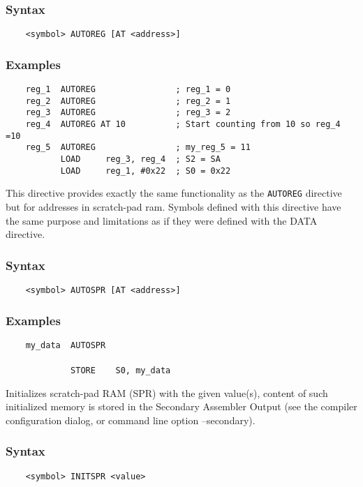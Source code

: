     \subsubsection{Syntax}
        \verb'    <symbol> AUTOREG [AT <address>]'

    \subsubsection{Examples}
        \verb'    reg_1  AUTOREG                ; reg_1 = 0'\\
        \verb'    reg_2  AUTOREG                ; reg_2 = 1'\\
        \verb'    reg_3  AUTOREG                ; reg_3 = 2'\\
        \verb'    reg_4  AUTOREG AT 10          ; Start counting from 10 so reg_4 =10'\\
        \verb'    reg_5  AUTOREG                ; my_reg_5 = 11'
        \verb''\\
        \verb'           LOAD     reg_3, reg_4  ; S2 = SA'\\
        \verb'           LOAD     reg_1, #0x22  ; S0 = 0x22'

    This directive provides exactly the same functionality as the \texttt{AUTOREG} directive but for addresses in scratch-pad ram. Symbols defined with this directive have the same purpose and limitations as if they were defined with the DATA directive.

    \subsubsection{Syntax}
        \verb'    <symbol> AUTOSPR [AT <address>]'

    \subsubsection{Examples}
        \verb'    my_data  AUTOSPR'\\
        \verb''\\
        \verb'             STORE    S0, my_data'

\clearpage
{}
    Initializes scratch-pad RAM (SPR) with the given value(s), content of such initialized memory is stored in the Secondary Assembler Output (see the compiler configuration dialog, or command line option --secondary).

    \subsubsection{Syntax}
        \verb'    <symbol> INITSPR <value>'

